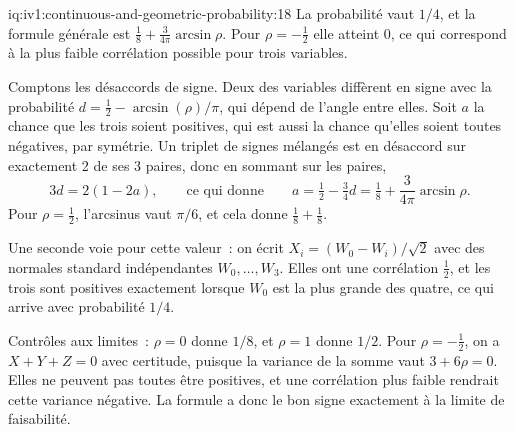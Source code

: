 \begin{solution}{iq:iv1:continuous-and-geometric-probability:18}
La probabilité vaut $1/4$, et la formule générale est $\tfrac18 + \tfrac{3}{4\pi} \arcsin \rho$. Pour $\rho = -\tfrac12$ elle atteint 0, ce qui correspond à la plus faible corrélation possible pour trois variables.

Comptons les désaccords de signe. Deux des variables diffèrent en signe avec la probabilité $d = \tfrac12 - \arcsin(\rho)/\pi$, qui dépend de l'angle entre elles. Soit $a$ la chance que les trois soient positives, qui est aussi la chance qu'elles soient toutes négatives, par symétrie. Un triplet de signes mélangés est en désaccord sur exactement 2 de ses 3 paires, donc en sommant sur les paires,
\[
3d = 2(1 - 2a), \qquad\text{ce qui donne}\qquad a = \tfrac12 - \tfrac34 d = \tfrac18 + \frac{3}{4\pi}\arcsin\rho.
\]
Pour $\rho = \tfrac12$, l'arcsinus vaut $\pi/6$, et cela donne $\tfrac18 + \tfrac18$.

Une seconde voie pour cette valeur~: on écrit $X_i = (W_0 - W_i)/\sqrt{2}$ avec des normales standard indépendantes $W_0, \dots, W_3$. Elles ont une corrélation $\tfrac12$, et les trois sont positives exactement lorsque $W_0$ est la plus grande des quatre, ce qui arrive avec probabilité $1/4$.

Contrôles aux limites~: $\rho = 0$ donne $1/8$, et $\rho = 1$ donne $1/2$. Pour $\rho = -\tfrac12$, on a $X + Y + Z = 0$ avec certitude, puisque la variance de la somme vaut $3 + 6\rho = 0$. Elles ne peuvent pas toutes être positives, et une corrélation plus faible rendrait cette variance négative. La formule a donc le bon signe exactement à la limite de faisabilité.

\end{solution}

